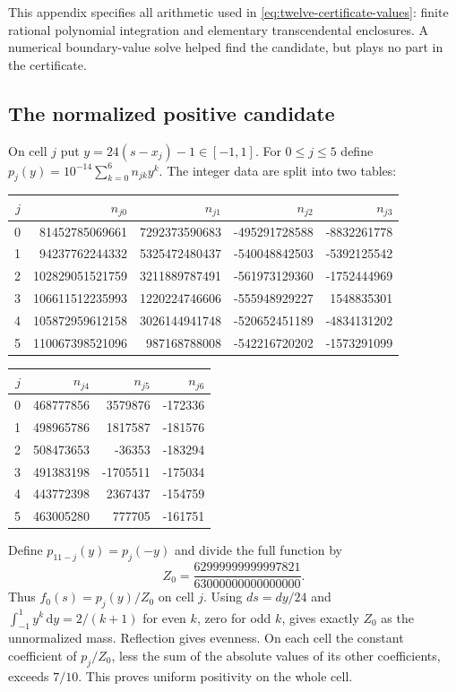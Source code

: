 \documentclass[11pt,reqno]{amsart}
\numberwithin{equation}{section}
\newcommand{\dd}{\,\mathrm d}
\begin{document}
This appendix specifies all arithmetic used in
\eqref{eq:twelve-certificate-values}: finite rational polynomial
integration and elementary transcendental enclosures.
A numerical boundary-value solve helped find the candidate,
but plays no part in the certificate.

\subsection{The normalized positive candidate}

On cell $j$ put $y=24(s-x_j)-1\in[-1,1]$.
For $0\le j\le5$ define
$p_j(y)=10^{-14}\sum_{k=0}^6n_{jk}y^k$.
The integer data are split into two tables:
\begin{center}
\small
\begin{tabular}{rrrrr}
\toprule
$j$&$n_{j0}$&$n_{j1}$&$n_{j2}$&$n_{j3}$\\
\midrule
0&81452785069661&7292373590683&-495291728588&-8832261778\\
1&94237762244332&5325472480437&-540048842503&-5392125542\\
2&102829051521759&3211889787491&-561973129360&-1752444969\\
3&106611512235993&1220224746606&-555948929227&1548835301\\
4&105872959612158&3026144941748&-520652451189&-4834131202\\
5&110067398521096&987168788008&-542216720202&-1573291099\\
\bottomrule
\end{tabular}
\end{center}
\begin{center}
\small
\begin{tabular}{rrrr}
\toprule
$j$&$n_{j4}$&$n_{j5}$&$n_{j6}$\\
\midrule
0&468777856&3579876&-172336\\
1&498965786&1817587&-181576\\
2&508473653&-36353&-183294\\
3&491383198&-1705511&-175034\\
4&443772398&2367437&-154759\\
5&463005280&777705&-161751\\
\bottomrule
\end{tabular}
\end{center}
Define $p_{11-j}(y)=p_j(-y)$ and divide the full function by
\begin{equation}
 Z_0=\frac{62999999999997821}{63000000000000000}.
 \label{eq:twelve-normalizer}
\end{equation}
Thus $f_0(s)=p_j(y)/Z_0$ on cell $j$.
Using $ds=dy/24$ and
$\int_{-1}^1y^k\dd y=2/(k+1)$ for even $k$, zero for odd $k$,
gives exactly $Z_0$ as the unnormalized mass.
Reflection gives evenness.
On each cell the constant coefficient of $p_j/Z_0$, less the
sum of the absolute values of its other coefficients, exceeds
$7/10$. This proves uniform positivity on the whole cell.
\end{document}
